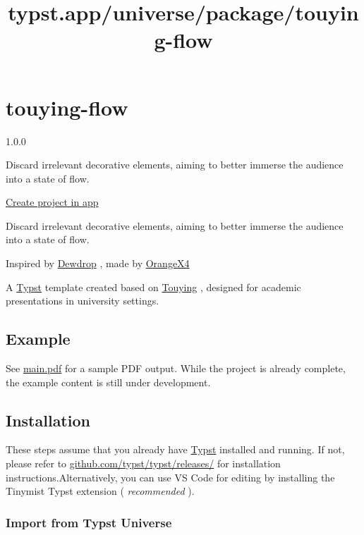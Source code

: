 \title{typst.app/universe/package/touying-flow}

\label{banner}
\label{template-thumbnail}

\section{touying-flow}\label{touying-flow}

{ 1.0.0 }

Discard irrelevant decorative elements, aiming to better immerse the
audience into a state of flow.

\href{/app?template=touying-flow&version=1.0.0}{Create project in app}

\label{readme}
Discard irrelevant decorative elements, aiming to better immerse the
audience into a state of flow.

Inspired by \href{https://github.com/touying-typ/touying.git}{Dewdrop} ,
made by \href{https://github.com/OrangeX4}{OrangeX4}

A \href{https://github.com/typst/typst}{Typst} template created based on
\href{https://github.com/touying-typ/touying}{Touying} , designed for
academic presentations in university settings.

\subsection{Example}\label{example}

See
\href{https://github.com/typst/packages/raw/main/packages/preview/touying-flow/1.0.0/main.pdf}{main.pdf}
for a sample PDF output. While the project is already complete, the
example content is still under development.

\subsection{Installation}\label{installation}

These steps assume that you already have
\href{https://typst.app/}{Typst} installed and running. If not, please
refer to
\href{https://github.com/typst/typst/releases/}{github.com/typst/typst/releases/}
for installation instructions.Alternatively, you can use VS Code for
editing by installing the Tinymist Typst extension ( \emph{recommended}
).

\subsubsection{Import from Typst
Universe}\label{import-from-typst-universe}

